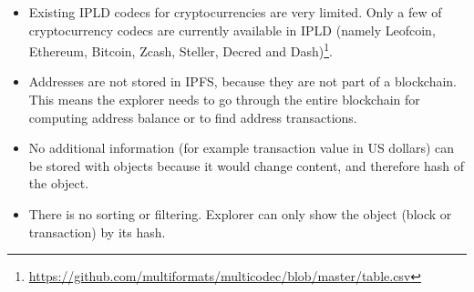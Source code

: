 \begin{itemize}
    \item Existing IPLD codecs for cryptocurrencies are very limited. Only a few of cryptocurrency codecs are currently available in IPLD (namely Leofcoin, Ethereum, Bitcoin, Zcash, Steller, Decred and Dash)\footnote{\url{https://github.com/multiformats/multicodec/blob/master/table.csv}}.
    \item Addresses are not stored in IPFS, because they are not part of a blockchain. This means the explorer needs to go through the entire blockchain for computing address balance or to find address transactions.
    \item No additional information (for example transaction value in US dollars) can be stored with objects because it would change content, and therefore hash of the object.
    \item There is no sorting or filtering. Explorer can only show the object (block or transaction) by its hash. 
\end{itemize}




